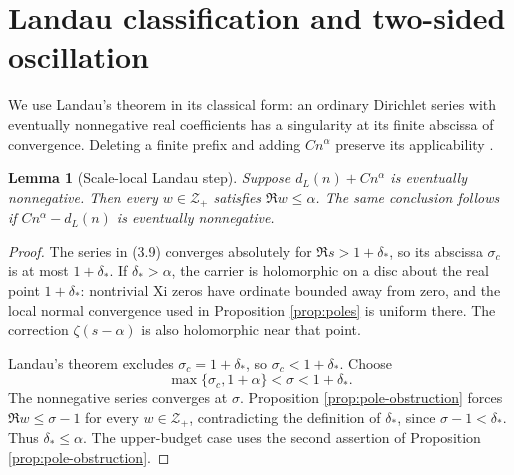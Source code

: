 \documentclass[11pt]{article}
\newtheorem{lemma}[theorem]{Lemma}
\newcommand{\cZ}{\mathcal Z}
\begin{document}
\section{Landau classification and two-sided oscillation}\label{sec:landau}

We use Landau's theorem in its classical form: an ordinary Dirichlet series with eventually
nonnegative real coefficients has a singularity at its finite abscissa of convergence.  Deleting
a finite prefix and adding \(Cn^\alpha\) preserve its applicability
\cite{Landau1905,Maurizi2010}.

\begin{lemma}[Scale-local Landau step]\label{lem:landau}
Suppose \(d_L(n)+Cn^\alpha\) is eventually nonnegative.  Then every
\(w\in\cZ_+\) satisfies \(\Re w\le\alpha\).  The same conclusion follows if
\(Cn^\alpha-d_L(n)\) is eventually nonnegative.
\end{lemma}

\begin{proof}
The series in (3.9) converges absolutely for \(\Re s>1+\delta_*\), so its abscissa
\(\sigma_c\) is at most \(1+\delta_*\).  If \(\delta_*>\alpha\), the carrier is holomorphic on a
disc about the real point \(1+\delta_*\): nontrivial Xi zeros have ordinate bounded away from
zero, and the local normal convergence used in Proposition \ref{prop:poles} is uniform there.
The correction \(\zeta(s-\alpha)\) is also holomorphic near that point.

Landau's theorem excludes \(\sigma_c=1+\delta_*\), so
\(\sigma_c<1+\delta_*\).  Choose
\[
 \max\{\sigma_c,1+\alpha\}<\sigma<1+\delta_*.
\]
The nonnegative series converges at \(\sigma\).  Proposition
\ref{prop:pole-obstruction} forces \(\Re w\le\sigma-1\) for every \(w\in\cZ_+\), contradicting
the definition of \(\delta_*\), since \(\sigma-1<\delta_*\).  Thus
\(\delta_*\le\alpha\).  The upper-budget case uses the second assertion of Proposition
\ref{prop:pole-obstruction}.
\end{proof}
\end{document}
